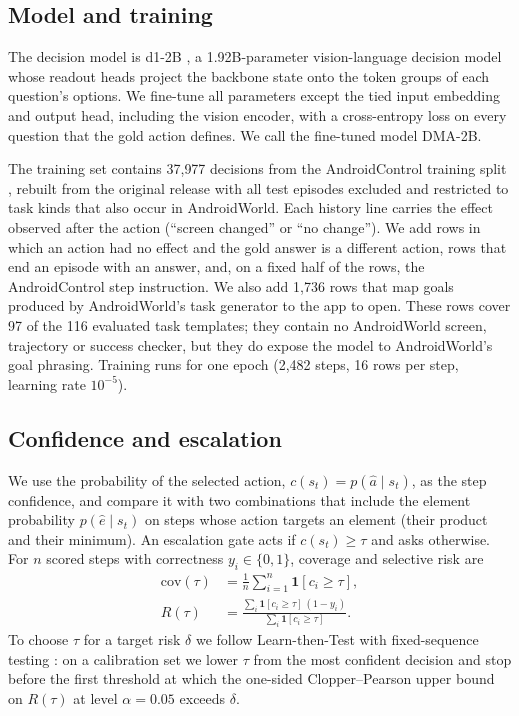 \documentclass{article}
\newcommand{\ours}{DMA-2B}
\begin{document}
\subsection{Model and training}
The decision model is d1-2B \citep{liquidd12026}, a 1.92B-parameter vision-language decision model whose
readout heads project the backbone state onto the token groups of each question's options. We fine-tune all
parameters except the tied input embedding and output head, including the vision encoder, with a cross-entropy
loss on every question that the gold action defines. We call the fine-tuned model \ours{}.

The training set contains 37{,}977 decisions from the AndroidControl training split \citep{androidcontrol2024},
rebuilt from the original release with all test episodes excluded and restricted to task kinds that also occur in
AndroidWorld. Each history line carries the effect observed after the action (``screen changed'' or ``no
change''). We add rows in which an action had no effect and the gold answer is a different action, rows that end
an episode with an answer, and, on a fixed half of the rows, the AndroidControl step instruction. We also add
1{,}736 rows that map goals produced by AndroidWorld's task generator to the app to open. These rows cover 97 of
the 116 evaluated task templates; they contain no AndroidWorld screen, trajectory or success checker, but they do
expose the model to AndroidWorld's goal phrasing. Training runs for one epoch (2{,}482 steps, 16 rows per step,
learning rate $10^{-5}$).

\subsection{Confidence and escalation}
\label{sec:gate}
We use the probability of the selected action, $c(s_t) = p(\hat a \mid s_t)$, as the step confidence, and
compare it with two combinations that include the element probability $p(\hat e \mid s_t)$ on steps whose
action targets an element (their product and their minimum). An escalation gate acts if $c(s_t) \geq \tau$ and
asks otherwise. For $n$ scored steps with correctness $y_i \in \{0,1\}$, coverage and selective risk are
\begin{align}
  \mathrm{cov}(\tau) &= \frac{1}{n}\sum_{i=1}^{n} \mathbf{1}[c_i \geq \tau], \\
  R(\tau) &= \frac{\sum_{i} \mathbf{1}[c_i \geq \tau]\,(1-y_i)}{\sum_{i} \mathbf{1}[c_i \geq \tau]}.
\end{align}
To choose $\tau$ for a target risk $\delta$ we follow Learn-then-Test with fixed-sequence testing
\citep{angelopoulos2021ltt}: on a calibration set we lower $\tau$ from the most confident decision and stop
before the first threshold at which the one-sided Clopper--Pearson upper bound on $R(\tau)$ at level
$\alpha = 0.05$ exceeds $\delta$.
\end{document}
